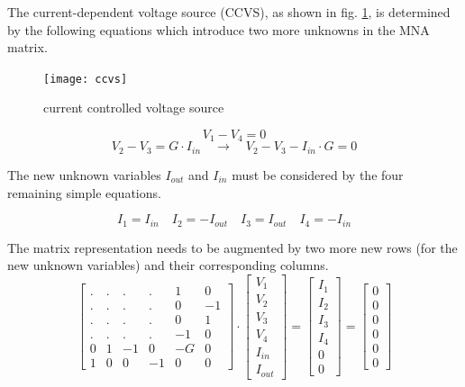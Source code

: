 The current-dependent voltage source (CCVS), as shown in fig.
\ref{fig:ccvs}, is determined by the following equations which
introduce two more unknowns in the MNA matrix.

\begin{figure}[ht]
\begin{center}
\texttt{[image: ccvs]}
\end{center}
\caption{current controlled voltage source}
\label{fig:ccvs}
\end{figure}
\FloatBarrier

\begin{equation}
V_{1} - V_{4} = 0
\end{equation}
\begin{equation}
V_{2} - V_{3} = G\cdot I_{in}
\quad \rightarrow \quad
V_{2} - V_{3} - I_{in}\cdot G = 0
\label{eq:ccvs}
\end{equation}

The new unknown variables $I_{out}$ and $I_{in}$ must be considered by
the four remaining simple equations.

\begin{equation}
I_{1} = I_{in} \quad I_{2} = -I_{out} \quad I_{3} = I_{out} \quad I_{4} = -I_{in}
\end{equation}

The matrix representation needs to be augmented by two more new rows
(for the new unknown variables) and their corresponding columns.
\begin{equation}
\begin{bmatrix}
.&.&.&.& 1 & 0\\
.&.&.&.& 0 & -1\\
.&.&.&.& 0 & 1\\
.&.&.&.& -1 & 0\\
0 & 1 & -1 & 0 & -G & 0\\
1 & 0 & 0 & -1 & 0 & 0
\end{bmatrix}
\cdot
\begin{bmatrix}
V_{1}\\
V_{2}\\
V_{3}\\
V_{4}\\
I_{in}\\
I_{out}
\end{bmatrix}
=
\begin{bmatrix}
I_{1}\\
I_{2}\\
I_{3}\\
I_{4}\\
0\\
0
\end{bmatrix}
=
\begin{bmatrix}
0\\
0\\
0\\
0\\
0\\
0
\end{bmatrix}
\end{equation}


